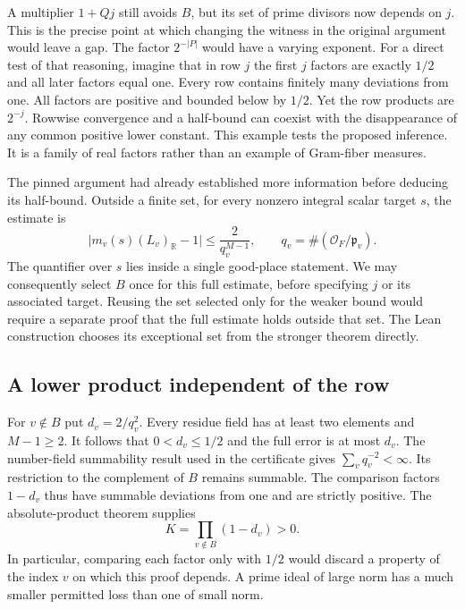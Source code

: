 \documentclass[12pt,letterpaper]{article}
\begin{document}
A multiplier $1+Qj$ still avoids $B$, but its set of prime divisors now depends on $j$. This is the precise point at which changing the witness in the original argument would leave a gap. The factor $2^{-|P|}$ would have a varying exponent. For a direct test of that reasoning, imagine that in row $j$ the first $j$ factors are exactly $1/2$ and all later factors equal one. Every row contains finitely many deviations from one. All factors are positive and bounded below by $1/2$. Yet the row products are $2^{-j}$. Rowwise convergence and a half-bound can coexist with the disappearance of any common positive lower constant. This example tests the proposed inference. It is a family of real factors rather than an example of Gram-fiber measures.

The pinned argument had already established more information before deducing its half-bound. Outside a finite set, for every nonzero integral scalar target $s$, the estimate is
\[
 \big|m_v(s)(L_v)_{\mathbb R}-1\big|
       \leq \frac{2}{q_v^{M-1}}, \qquad
 q_v=\#(\mathcal O_F/\mathfrak p_v).
\]
The quantifier over $s$ lies inside a single good-place statement. We may consequently select $B$ once for this full estimate, before specifying $j$ or its associated target. Reusing the set selected only for the weaker bound would require a separate proof that the full estimate holds outside that set. The Lean construction chooses its exceptional set from the stronger theorem directly.

\subsection{A lower product independent of the row}

For $v\notin B$ put $d_v=2/q_v^2$. Every residue field has at least two elements and $M-1\geq 2$. It follows that $0<d_v\leq 1/2$ and the full error is at most $d_v$. The number-field summability result used in the certificate gives $\sum_v q_v^{-2}<\infty$. Its restriction to the complement of $B$ remains summable. The comparison factors $1-d_v$ thus have summable deviations from one and are strictly positive. The absolute-product theorem supplies
\[
              K=\prod_{v\notin B}(1-d_v)>0.
\]
In particular, comparing each factor only with $1/2$ would discard a property of the index $v$ on which this proof depends. A prime ideal of large norm has a much smaller permitted loss than one of small norm.
\end{document}

